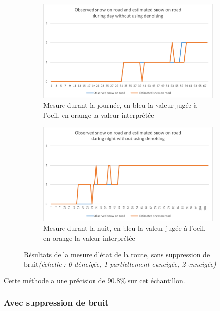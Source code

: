 \begin{figure}[H]
\begin{subfigure}{.45\textwidth}
        \includegraphics[width=\linewidth]{Images/computer_vision/snowOnRoad/dayResults_noise.png}
        \caption{Mesure durant la journée, en bleu la valeur jugée à l'oeil, en orange la valeur interprétée}
        \label{fig:SnowOnRoad_noise_dayResults}
    \end{subfigure}
    \hfill
    \begin{subfigure}{.45\textwidth}
        \includegraphics[width=\linewidth]{Images/computer_vision/snowOnRoad/nightResults_noise.png}
        \caption{Mesure durant la nuit, en bleu la valeur jugée à l'oeil, en orange la valeur interprétée}
        \label{fig:SnowOnRoad_noise_nightResults}
    \end{subfigure}
    \caption{Résultats de la mesure d'état de la route, sans suppression de bruit\emph{(échelle : 0 déneigée, 1 partiellement enneigée, 2 enneigée)}}
    \label{fig:SnowOnRoad_noise_results}
\end{figure}
Cette méthode a une précision de $90.8\%$ sur cet échantillon.

\subsubsection{Avec suppression de bruit}

